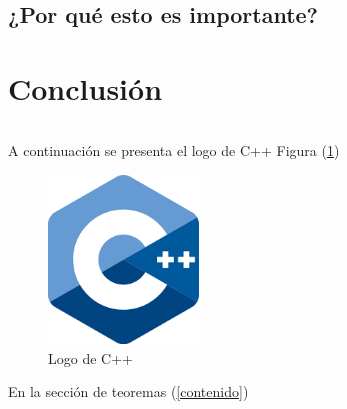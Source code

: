 \documentclass{article}
\begin{document}
\subsection{¿Por qué esto es importante?}



\section{Conclusión} \label{conclulsion}


\begin{lstlisting}

\end{lstlisting}

A continuación se presenta el logo de C++ Figura (\ref{fig:cpplogo})

\begin{figure}[h]
\includegraphics[width=4cm]{cpplogo.png}
\centering
\caption{Logo de C++}
\label{fig:cpplogo}
\end{figure}

En la sección de teoremas (\ref{contenido})



 

\end{document}
